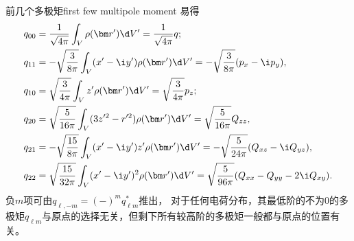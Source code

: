 
\begin{example}{前几个多极矩}{first few multipole moment}
    易得
    \begin{subequations}
        \begin{align}
            q_{00}&=\frac1{\sqrt{4\pi}}\int_V\rho(\bm r')\d V'=\frac1{\sqrt{4\pi}}q;\\
            q_{11}&=-\sqrt{\frac3{8\pi}}\int_V(x'-\i y')\rho(\bm r')\d V'=-\sqrt{\frac3{8\pi}}(p_x-\i p_y),\\
            q_{10}&=\sqrt{\frac3{4\pi}}\int_V z'\rho(\bm r')\d V'=\sqrt{\frac3{4\pi}}p_z;\\
            q_{20}&=\sqrt{\frac5{16\pi}}\int_V(3z'^2-r'^2)\rho(\bm r')\d V'=\sqrt{\frac5{16\pi}}Q_{zz},\\
            q_{21}&=-\sqrt{\frac{15}{8\pi}}\int_V(x'-\i y')z'\rho(\bm r')\d V'=-\sqrt{\frac5{24\pi}}(Q_{xz}-\i Q_{yz}),\\
            q_{22}&=\sqrt{\frac{15}{32\pi}}\int_V(x'-\i y')^2\rho(\bm r')\d V'=\sqrt{\frac5{96\pi}}(Q_{xx}-Q_{yy}-2\i Q_{xy}).
        \end{align}
    \end{subequations}
    负$m$项可由$q_{\ell,-m}=(-)^mq_{\ell m}^\ast$推出，
    \tcblower
    对于任何电荷分布，其最低阶的不为0的多极矩$q_{\ell m}$与原点的选择无关，但剩下所有较高阶的多极矩一般都与原点的位置有关。
\end{example}

